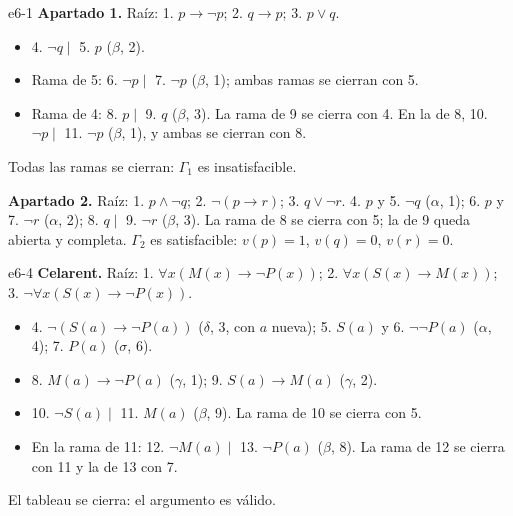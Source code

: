 \begin{solucion}{e6-1}
\textbf{Apartado 1.} Raíz: 1. $p \to \neg p$; 2. $q \to p$; 3. $p \lor q$.
\begin{itemize}
    \item 4. $\neg q \mid$ 5. $p$ ($\beta$, 2).
    \item Rama de 5: 6. $\neg p \mid$ 7. $\neg p$ ($\beta$, 1); ambas ramas se cierran con 5.
    \item Rama de 4: 8. $p \mid$ 9. $q$ ($\beta$, 3). La rama de 9 se cierra con 4. En la de 8, 10. $\neg p \mid$ 11. $\neg p$ ($\beta$, 1), y ambas se cierran con 8.
\end{itemize}
Todas las ramas se cierran: $\Gamma_1$ es insatisfacible.

\noindent\textbf{Apartado 2.} Raíz: 1. $p \land \neg q$; 2. $\neg(p \to r)$; 3. $q \lor \neg r$. 4. $p$ y 5. $\neg q$ ($\alpha$, 1); 6. $p$ y 7. $\neg r$ ($\alpha$, 2); 8. $q \mid$ 9. $\neg r$ ($\beta$, 3). La rama de 8 se cierra con 5; la de 9 queda abierta y completa. $\Gamma_2$ es satisfacible: $v(p) = 1$, $v(q) = 0$, $v(r) = 0$.
\end{solucion}

\begin{solucion}{e6-4}
\textbf{Celarent.} Raíz: 1. $\forall x (M(x) \to \neg P(x))$; 2. $\forall x (S(x) \to M(x))$; 3. $\neg \forall x (S(x) \to \neg P(x))$.
\begin{itemize}
    \item 4. $\neg(S(a) \to \neg P(a))$ ($\delta$, 3, con $a$ nueva); 5. $S(a)$ y 6. $\neg\neg P(a)$ ($\alpha$, 4); 7. $P(a)$ ($\sigma$, 6).
    \item 8. $M(a) \to \neg P(a)$ ($\gamma$, 1); 9. $S(a) \to M(a)$ ($\gamma$, 2).
    \item 10. $\neg S(a) \mid$ 11. $M(a)$ ($\beta$, 9). La rama de 10 se cierra con 5.
    \item En la rama de 11: 12. $\neg M(a) \mid$ 13. $\neg P(a)$ ($\beta$, 8). La rama de 12 se cierra con 11 y la de 13 con 7.
\end{itemize}
El tableau se cierra: el argumento es válido.
\end{solucion}

